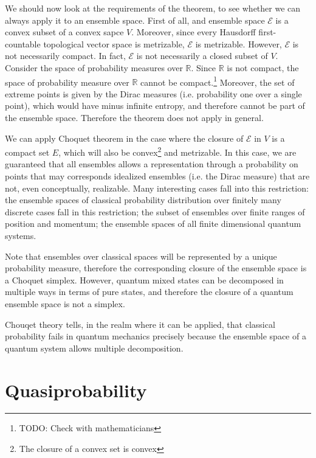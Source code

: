 \documentclass[10pt,twocolumn, nofootinbib]{revtex4-2}
\newcommand{\Ens}[1][E] {\mathcal{#1}} %
\begin{document}
We should now look at the requirements of the theorem, to see whether we can always apply it to an ensemble space. First of all, and ensemble space $\Ens$ is a convex subset of a convex sapce $V$. Moreover, since every Hausdorff first-countable topological vector space is metrizable, $\Ens$ is metrizable. However, $\Ens$ is not necessarily compact. In fact, $\Ens$ is not necessarily a closed subset of $V$. Consider the space of probability measures over $\mathbb{R}$. Since $\mathbb{R}$ is not compact, the space of probability measure over $\mathbb{R}$ cannot be compact.\footnote{TODO: Check with mathematicians} Moreover, the set of extreme points is given by the Dirac measures (i.e. probability one over a single point), which would have minus infinite entropy, and therefore cannot be part of the ensemble space. Therefore the theorem does not apply in general.

We can apply Choquet theorem in the case where the closure of $\Ens$ in $V$ is a compact set $E$, which will also be convex\footnote{The closure of a convex set is convex} and metrizable. In this case, we are guaranteed that all ensembles allows a representation through a probability on points that may corresponds idealized ensembles (i.e. the Dirac measure) that are not, even conceptually, realizable. Many interesting cases fall into this restriction: the ensemble spaces of classical probability distribution over finitely many discrete cases fall in this restriction; the subset of ensembles over finite ranges of position and momentum; the ensemble spaces of all finite dimensional quantum systems.

Note that ensembles over classical spaces will be represented by a unique probability measure, therefore the corresponding closure of the ensemble space is a Choquet simplex. However, quantum mixed states can be decomposed in multiple ways in terms of pure states, and therefore the closure of a quantum ensemble space is not a simplex.


Chouqet theory tells, in the realm where it can be applied, that classical probability fails in quantum mechanics precisely because the ensemble space of a quantum system allows multiple decomposition.

\section{Quasiprobability}
\end{document}
